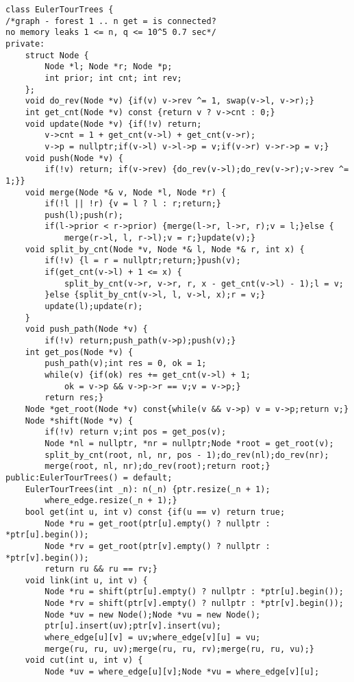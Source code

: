 \documentclass[12pt]{article}
\begin{document}
\begin{verbatim}
class EulerTourTrees {
/*graph - forest 1 .. n get = is connected?
no memory leaks 1 <= n, q <= 10^5 0.7 sec*/
private: 
    struct Node {
        Node *l; Node *r; Node *p;
        int prior; int cnt; int rev;    
    };
    void do_rev(Node *v) {if(v) v->rev ^= 1, swap(v->l, v->r);}
    int get_cnt(Node *v) const {return v ? v->cnt : 0;}
    void update(Node *v) {if(!v) return;
        v->cnt = 1 + get_cnt(v->l) + get_cnt(v->r);
        v->p = nullptr;if(v->l) v->l->p = v;if(v->r) v->r->p = v;}
    void push(Node *v) {
        if(!v) return; if(v->rev) {do_rev(v->l);do_rev(v->r);v->rev ^= 1;}}
    void merge(Node *& v, Node *l, Node *r) {
        if(!l || !r) {v = l ? l : r;return;}
        push(l);push(r);
        if(l->prior < r->prior) {merge(l->r, l->r, r);v = l;}else {
            merge(r->l, l, r->l);v = r;}update(v);}
    void split_by_cnt(Node *v, Node *& l, Node *& r, int x) {
        if(!v) {l = r = nullptr;return;}push(v);
        if(get_cnt(v->l) + 1 <= x) {
            split_by_cnt(v->r, v->r, r, x - get_cnt(v->l) - 1);l = v;
        }else {split_by_cnt(v->l, l, v->l, x);r = v;}
        update(l);update(r);
    }
    void push_path(Node *v) {
        if(!v) return;push_path(v->p);push(v);}
    int get_pos(Node *v) {
        push_path(v);int res = 0, ok = 1;
        while(v) {if(ok) res += get_cnt(v->l) + 1;
            ok = v->p && v->p->r == v;v = v->p;}
        return res;}
    Node *get_root(Node *v) const{while(v && v->p) v = v->p;return v;}
    Node *shift(Node *v) {
        if(!v) return v;int pos = get_pos(v);
        Node *nl = nullptr, *nr = nullptr;Node *root = get_root(v);
        split_by_cnt(root, nl, nr, pos - 1);do_rev(nl);do_rev(nr);
        merge(root, nl, nr);do_rev(root);return root;}
public:EulerTourTrees() = default;
    EulerTourTrees(int _n): n(_n) {ptr.resize(_n + 1);
        where_edge.resize(_n + 1);}
    bool get(int u, int v) const {if(u == v) return true;
        Node *ru = get_root(ptr[u].empty() ? nullptr : *ptr[u].begin());
        Node *rv = get_root(ptr[v].empty() ? nullptr : *ptr[v].begin());
        return ru && ru == rv;}
    void link(int u, int v) {
        Node *ru = shift(ptr[u].empty() ? nullptr : *ptr[u].begin());
        Node *rv = shift(ptr[v].empty() ? nullptr : *ptr[v].begin());
        Node *uv = new Node();Node *vu = new Node();
        ptr[u].insert(uv);ptr[v].insert(vu);
        where_edge[u][v] = uv;where_edge[v][u] = vu;
        merge(ru, ru, uv);merge(ru, ru, rv);merge(ru, ru, vu);}
    void cut(int u, int v) {
        Node *uv = where_edge[u][v];Node *vu = where_edge[v][u];

\end{verbatim}
\end{document}
